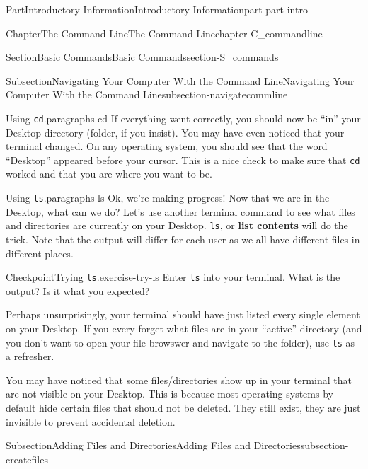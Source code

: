 \documentclass[oneside,10pt,]{book}
\newcommand{\mono}[1]{\texttt{#1}}
\newcommand{\terminology}[1]{\textbf{#1}}
\begin{document}
\begin{partptx}{Part}{Introductory Information}{}{Introductory Information}{}{}{part-part-intro}
\begin{chapterptx}{Chapter}{The Command Line}{}{The Command Line}{}{}{chapter-C_commandline}
\begin{sectionptx}{Section}{Basic Commands}{}{Basic Commands}{}{}{section-S_commands}
\begin{subsectionptx}{Subsection}{Navigating Your Computer With the Command Line}{}{Navigating Your Computer With the Command Line}{}{}{subsection-navigatecommline}
\begin{paragraphs}{Using \mono{cd}.}{paragraphs-cd}
If everything went correctly, you should now be ``in'' your Desktop directory (folder, if you insist). You may have even noticed that your terminal changed. On any operating system, you should see that the word ``Desktop'' appeared before your cursor. This is a nice check to make sure that \mono{cd} worked and that you are where you want to be.%
\end{paragraphs}%
\begin{paragraphs}{Using \mono{ls}.}{paragraphs-ls}%
\index{command line!\mono{ls}}%
\index{\mono{ls}}%
%
Ok, we're making progress! Now that we are in the Desktop, what can we do? Let's use another terminal command to see what files and directories are currently on your Desktop. \mono{ls}, or \terminology{list contents} will do the trick. Note that the output will differ for each user as we all have different files in different places.%
\begin{inlineexercise}{Checkpoint}{Trying \mono{ls}.}{exercise-try-ls}%
Enter \mono{ls} into your terminal. What is the output? Is it what you expected?%
\end{inlineexercise}%
Perhaps unsurprisingly, your terminal should have just listed every single element on your Desktop. If you every forget what files are in your ``active'' directory (and you don't want to open your file browswer and navigate to the folder), use \mono{ls} as a refresher.%
\par
You may have noticed that some files\slash{}directories show up in your terminal that are not visible on your Desktop. This is because most operating systems by default hide certain files that should not be deleted. They still exist, they are just invisible to prevent accidental deletion.%
\end{paragraphs}%
\end{subsectionptx}
%
%
\typeout{************************************************}
\typeout{************************************************}
%
\begin{subsectionptx}{Subsection}{Adding Files and Directories}{}{Adding Files and Directories}{}{}{subsection-createfiles}
%

\end{subsectionptx}
\end{sectionptx}
\end{chapterptx}
\end{partptx}
\end{document}
